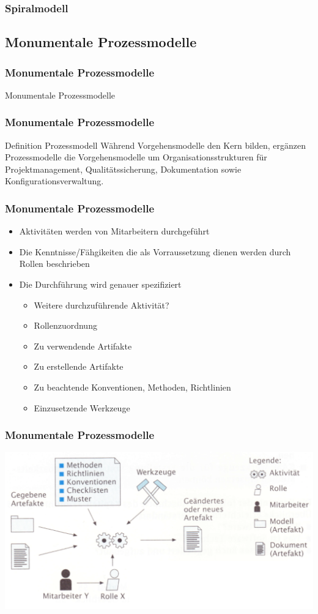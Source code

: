 \begin{frame}
\frametitle{Spiralmodell}
	
\end{frame}

\subsection{Monumentale Prozessmodelle}
\begin{frame}
\frametitle{Monumentale Prozessmodelle}
\huge Monumentale Prozessmodelle
\end{frame}

\begin{frame}
\frametitle{Monumentale Prozessmodelle}
	\begin{block}{Definition Prozessmodell}
		Während Vorgehensmodelle den Kern bilden, ergänzen Prozessmodelle die Vorgehensmodelle um 
		Organisationsstrukturen für Projektmanagement, Qualitätssicherung, Dokumentation sowie 
		Konfigurationsverwaltung.
	\end{block}
\end{frame}

\begin{frame}
\frametitle{Monumentale Prozessmodelle}
	\begin{itemize}
		\item Aktivitäten werden von Mitarbeitern durchgeführt
		\item Die Kenntnisse/Fähgikeiten die als Vorraussetzung dienen
		werden durch Rollen beschrieben
		\item Die Durchführung wird genauer spezifiziert
		\begin{itemize}
			\item Weitere durchzuführende Aktivität?
			\item Rollenzuordnung
			\item Zu verwendende Artifakte
			\item Zu erstellende Artifakte
			\item Zu beachtende Konventionen, Methoden, Richtlinien
			\item Einzusetzende Werkzeuge
		\end{itemize}
	\end{itemize}
\end{frame}

\begin{frame}
\frametitle{Monumentale Prozessmodelle}
	\center\includegraphics[width=1\textwidth,
			keepaspectratio=true]{bilder/prozessmodell.png}
\end{frame}

